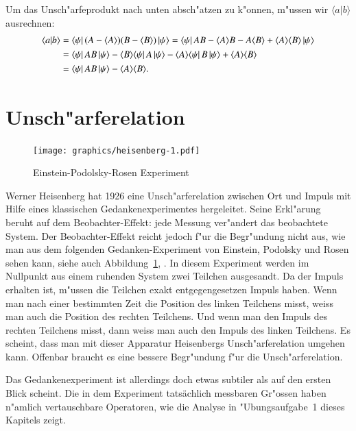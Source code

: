 Um das Unsch"arfeprodukt nach unten absch"atzen zu k"onnen, m"ussen
wir $\langle a|b\rangle$ ausrechnen:
\begin{align}
\langle a|b\rangle
&=
\langle\psi|\,
(A-\langle A\rangle)(B-\langle B\rangle)
\,|\psi\rangle
=
\langle\psi|\,
AB-\langle A\rangle B-A\langle B\rangle
+
\langle A\rangle\langle B\rangle
\,|\psi\rangle
\notag
\\
&=
\langle\psi|\,AB\,|\psi\rangle
-\langle B\rangle\langle\psi|\,A\,|\psi\rangle
-\langle A\rangle\langle\psi|\,B\,|\psi\rangle
+
\langle A\rangle\langle B\rangle
\notag
\\
&=
\langle\psi|\,AB\,|\psi\rangle
-
\langle A\rangle\langle B\rangle.
\label{skript:abausrechnung}
\end{align}

%
%
\section{Unsch"arferelation}
\begin{figure}
\centering
\texttt{[image: graphics/heisenberg-1.pdf]}
\caption{Einstein-Podolsky-Rosen Experiment
\label{skript:epr-experiment}}
\end{figure}
Werner Heisenberg hat 1926 eine Unsch"arferelation zwischen Ort und Impuls
mit Hilfe eines klassischen Gedankenexperimentes hergeleitet.
Seine Erkl"arung beruht auf dem Beobachter-Effekt: jede Messung
ver"andert das beobachtete System.
Der Beobachter-Effekt reicht jedoch f"ur die Begr"undung nicht
aus, wie man aus dem folgenden Gedanken-Experiment von Einstein,
Podolsky und Rosen sehen kann, siehe
auch Abbildung~\ref{skript:epr-experiment}, \cite{skript:epr}.
In diesem Experiment werden im Nullpunkt aus einem ruhenden System
zwei Teilchen ausgesandt.
Da der Impuls erhalten ist, m"ussen die Teilchen exakt entgegengesetzen
Impuls haben.
Wenn man nach einer bestimmten Zeit die Position des linken Teilchens misst,
weiss man auch die Position des rechten Teilchens.
Und wenn man den Impuls des rechten Teilchens misst, dann weiss
man auch den Impuls des linken Teilchens.
Es scheint, dass man mit dieser Apparatur Heisenbergs Unsch"arferelation
umgehen kann.
Offenbar braucht es eine bessere Begr"undung f"ur die Unsch"arferelation.

Das Gedankenexperiment ist allerdings doch etwas subtiler als auf den
ersten Blick scheint. 
Die in dem Experiment tatsächlich messbaren Gr"ossen haben n"amlich
vertauschbare Operatoren, wie die Analyse in "Ubungsaufgabe~1 dieses
Kapitels zeigt.


